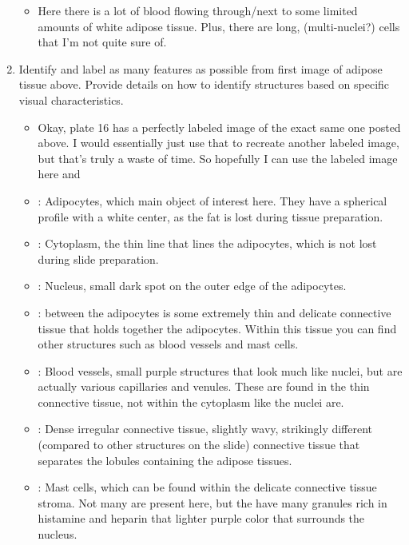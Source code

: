 \documentclass[basic]{inVerba-notes}
\begin{document}
\begin{enumerate}
\begin{itemize}
    \item Here there is a lot of blood flowing through/next to some limited amounts of white adipose tissue. Plus, there are long, (multi-nuclei?) cells that I'm not quite sure of. 
    
    \begin{center}
    \end{center}
    
  \end{itemize}

  \item Identify and label as many features as possible from first image of adipose tissue above. Provide details on how to identify structures based on specific visual characteristics. 
    \begin{itemize}
      \item Okay, plate 16 has a perfectly labeled image of the exact same one posted above. I would essentially just use that to recreate another labeled image, but that's truly a waste of time. So hopefully I can use the labeled image here and 
    \end{itemize}
  
    \begin{center}
    \end{center}

    \bigskip

    \begin{itemize} 
      \item {}: Adipocytes, which main object of interest here. They have a spherical profile with a white center, as the fat is lost during tissue preparation. 
      \item {}: Cytoplasm, the thin line that lines the adipocytes, which is not lost during slide preparation. 
      \item {}: Nucleus, small dark spot on the outer edge of the adipocytes.
      \item {}: between the adipocytes is some extremely thin and delicate connective tissue that holds together the adipocytes. Within this tissue you can find other structures such as blood vessels and mast cells.
      \item {}: Blood vessels, small purple structures that look much like nuclei, but are actually various capillaries and venules. These are found in the thin connective tissue, not within the cytoplasm like the nuclei are.
      \item {}: Dense irregular connective tissue, slightly wavy, strikingly different (compared to other structures on the slide) connective tissue that separates the lobules containing the adipose tissues. 
      \item {}: Mast cells, which can be found within the delicate connective tissue stroma. Not many are present here, but the have many granules rich in histamine and heparin that lighter purple color that surrounds the nucleus.
    \end{itemize}

\end{enumerate}
\end{document}
